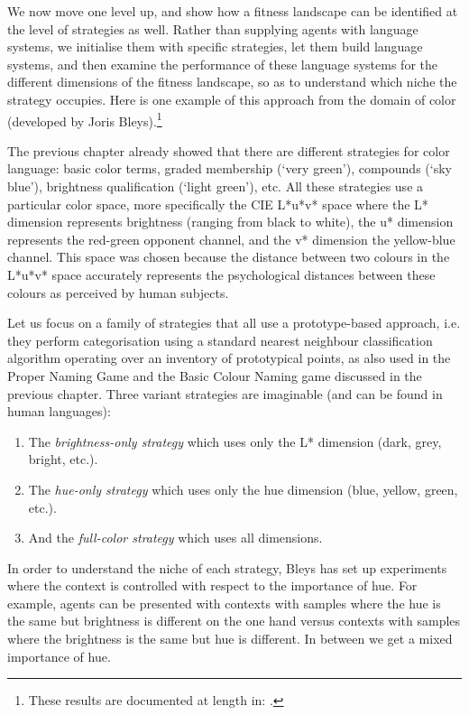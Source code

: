 We now move one level up, and show how a fitness landscape can be identified at the level of strategies as well. Rather than supplying 
agents with language systems, we initialise them 
with specific strategies, let them build language systems, and then examine the performance 
of these language systems for the different dimensions of the fitness landscape, so as to understand which niche 
the strategy occupies. Here is one example of this approach 
from the domain of color (developed by Joris Bleys).\footnote{These results are documented at length in: \cite{Bleys:2014}.}

The previous chapter already showed that there are 
different strategies for color language: basic color terms, graded membership (`very green'), compounds (`sky blue'), 
brightness qualification (`light green'), etc. All these strategies use a particular color space, more specifically 
the CIE L*u*v* space where the L* dimension represents brightness (ranging from black to white), the u* 
dimension represents the red-green opponent channel, 
and the v* dimension the yellow-blue channel. This space was chosen 
because the distance between two colours in the L*u*v* space accurately represents 
the psychological distances between these colours as perceived by human subjects. 

Let us focus on a family of strategies that all use a prototype-based approach, i.e. they perform categorisation using 
a standard nearest neighbour classification algorithm operating over an inventory of prototypical points, 
as also used in the Proper Naming Game and the Basic Colour Naming game discussed in the previous chapter. 
Three variant strategies are imaginable (and can be found in human languages): 
\begin{enumerate}
\item The {\itshape brightness-only strategy} which uses only the L* dimension (dark, grey, bright, etc.).
\item The {\itshape hue-only strategy} which uses only the hue dimension (blue, yellow, green, etc.). 
\item And the {\itshape full-color strategy} which uses all dimensions. 
\end{enumerate}
In order to understand the niche of each strategy, Bleys has set up experiments where the context is controlled 
with respect to the importance of hue. 
For example, agents can be presented with contexts with samples where the hue is the same but brightness is different on the one 
hand versus contexts with samples where the brightness is the same but hue is different. In between we get a mixed 
importance of hue. 

